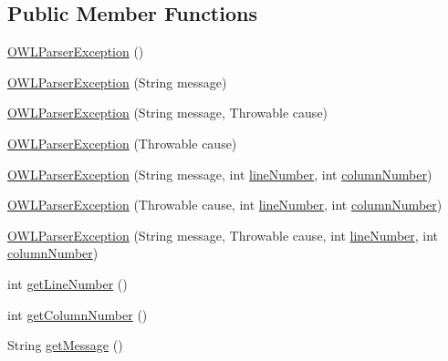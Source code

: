 \subsection*{Public Member Functions}
\begin{DoxyCompactItemize}
\item 
\hyperlink{classorg_1_1semanticweb_1_1owlapi_1_1io_1_1_o_w_l_parser_exception_a3c06dde76d94ad9f1390c37a2d7e11be}{O\-W\-L\-Parser\-Exception} ()
\item 
\hyperlink{classorg_1_1semanticweb_1_1owlapi_1_1io_1_1_o_w_l_parser_exception_a9cf9bd8bac2340258e2234b3076620ad}{O\-W\-L\-Parser\-Exception} (String message)
\item 
\hyperlink{classorg_1_1semanticweb_1_1owlapi_1_1io_1_1_o_w_l_parser_exception_aafff943fc575fd9fa0b200b3045f256b}{O\-W\-L\-Parser\-Exception} (String message, Throwable cause)
\item 
\hyperlink{classorg_1_1semanticweb_1_1owlapi_1_1io_1_1_o_w_l_parser_exception_a0fdbd29a372298147754f345d3c0a165}{O\-W\-L\-Parser\-Exception} (Throwable cause)
\item 
\hyperlink{classorg_1_1semanticweb_1_1owlapi_1_1io_1_1_o_w_l_parser_exception_a2d1b35efe257025f6ce17a34c9f04960}{O\-W\-L\-Parser\-Exception} (String message, int \hyperlink{classorg_1_1semanticweb_1_1owlapi_1_1io_1_1_o_w_l_parser_exception_a5a5d515eefd8c2871627e152d86c03c2}{line\-Number}, int \hyperlink{classorg_1_1semanticweb_1_1owlapi_1_1io_1_1_o_w_l_parser_exception_af0ad50fb6962ba9b17a4e358e1b82d38}{column\-Number})
\item 
\hyperlink{classorg_1_1semanticweb_1_1owlapi_1_1io_1_1_o_w_l_parser_exception_abccb2078adc0e04a5c118ff9c894cb2c}{O\-W\-L\-Parser\-Exception} (Throwable cause, int \hyperlink{classorg_1_1semanticweb_1_1owlapi_1_1io_1_1_o_w_l_parser_exception_a5a5d515eefd8c2871627e152d86c03c2}{line\-Number}, int \hyperlink{classorg_1_1semanticweb_1_1owlapi_1_1io_1_1_o_w_l_parser_exception_af0ad50fb6962ba9b17a4e358e1b82d38}{column\-Number})
\item 
\hyperlink{classorg_1_1semanticweb_1_1owlapi_1_1io_1_1_o_w_l_parser_exception_a8c7ec1ee22fb5b9e0ddbd80294bfe662}{O\-W\-L\-Parser\-Exception} (String message, Throwable cause, int \hyperlink{classorg_1_1semanticweb_1_1owlapi_1_1io_1_1_o_w_l_parser_exception_a5a5d515eefd8c2871627e152d86c03c2}{line\-Number}, int \hyperlink{classorg_1_1semanticweb_1_1owlapi_1_1io_1_1_o_w_l_parser_exception_af0ad50fb6962ba9b17a4e358e1b82d38}{column\-Number})
\item 
int \hyperlink{classorg_1_1semanticweb_1_1owlapi_1_1io_1_1_o_w_l_parser_exception_a8bed37608507daa8fa23a0ab0f749386}{get\-Line\-Number} ()
\item 
int \hyperlink{classorg_1_1semanticweb_1_1owlapi_1_1io_1_1_o_w_l_parser_exception_a66624ed37296b295774d281b7f8845c3}{get\-Column\-Number} ()
\item 
String \hyperlink{classorg_1_1semanticweb_1_1owlapi_1_1io_1_1_o_w_l_parser_exception_a5b2043fb9c0f714623aa2a855fc3ca6b}{get\-Message} ()
\end{DoxyCompactItemize}
